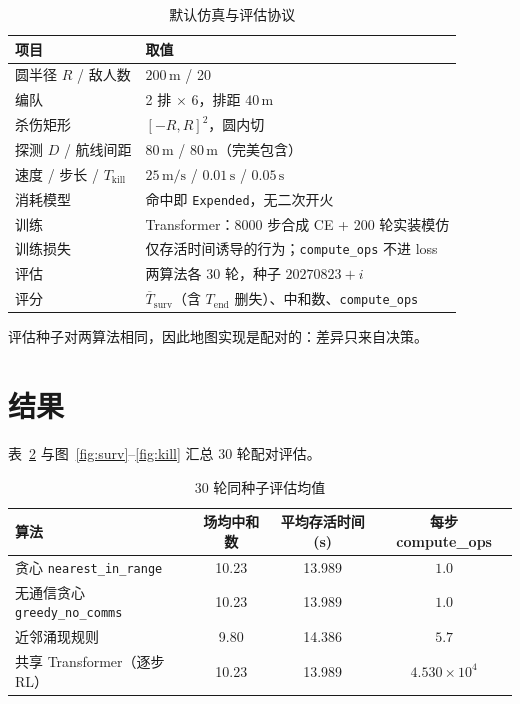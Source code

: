 \documentclass[12pt,a4paper]{article}
\begin{document}
\begin{table}[H]
\centering
\caption{默认仿真与评估协议}
\label{tab:setup}
\begin{tabular}{ll}
\toprule
项目 & 取值 \\
\midrule
圆半径 $R$ / 敌人数 & $200\,\mathrm{m}$ / 20 \\
编队 & 2 排 $\times$ 6，排距 $40\,\mathrm{m}$ \\
杀伤矩形 & $[-R,R]^2$，圆内切 \\
探测 $D$ / 航线间距 & $80\,\mathrm{m}$ / $80\,\mathrm{m}$（完美包含） \\
速度 / 步长 / $T_{\mathrm{kill}}$ & $25\,\mathrm{m/s}$ / $0.01\,\mathrm{s}$ / $0.05\,\mathrm{s}$ \\
消耗模型 & 命中即 \texttt{Expended}，无二次开火 \\
训练 & Transformer：8000 步合成 CE + 200 轮实装模仿 \\
训练损失 & 仅存活时间诱导的行为；\texttt{compute\_ops} 不进 loss \\
评估 & 两算法各 30 轮，种子 $20270823+i$ \\
评分 & $\overline{T}_{\mathrm{surv}}$（含 $T_{\mathrm{end}}$ 删失）、中和数、\texttt{compute\_ops} \\
\bottomrule
\end{tabular}
\end{table}

评估种子对两算法相同，因此地图实现是配对的：差异只来自决策。

\section{结果}

表~\ref{tab:res} 与图~\ref{fig:surv}--\ref{fig:kill} 汇总 30 轮配对评估。

\begin{table}[H]
\centering
\caption{30 轮同种子评估均值}
\label{tab:res}
\begin{tabular}{lccc}
\toprule
算法 & 场均中和数 & 平均存活时间 (s) & 每步 compute\_ops \\
\midrule
贪心 \texttt{nearest\_in\_range} & 10.23 & 13.989 & $1.0$ \\
无通信贪心 \texttt{greedy\_no\_comms} & 10.23 & 13.989 & $1.0$ \\
近邻涌现规则 & 9.80 & 14.386 & $5.7$ \\
共享 Transformer（逐步 RL） & 10.23 & 13.989 & $4.530\times 10^{4}$ \\
\bottomrule
\end{tabular}
\end{table}
\end{document}
